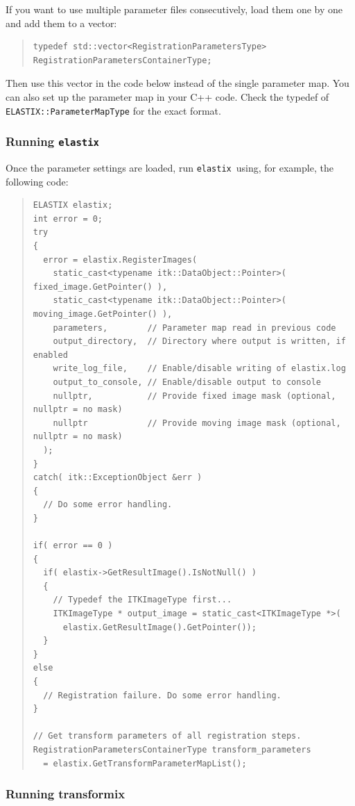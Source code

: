 \documentclass[]{report}
\newcommand{\elastix}{\texttt{elastix}}
\begin{document}
If you want to use multiple parameter files consecutively, load them
one by one and add them to a vector:
\begin{quote}
\begin{verbatim}
typedef std::vector<RegistrationParametersType> RegistrationParametersContainerType;
\end{verbatim}
\end{quote}
Then use this vector in the code below instead of the single
parameter map. You can also set up the parameter map in your C++
code. Check the typedef of \texttt{ELASTIX::ParameterMapType} for
the exact format.

\subsubsection{Running \elastix}

Once the parameter settings are loaded, run \elastix\ using, for
example, the following code:
\begin{quote}
\begin{verbatim}
ELASTIX elastix;
int error = 0;
try
{
  error = elastix.RegisterImages(
    static_cast<typename itk::DataObject::Pointer>( fixed_image.GetPointer() ),
    static_cast<typename itk::DataObject::Pointer>( moving_image.GetPointer() ),
    parameters,        // Parameter map read in previous code
    output_directory,  // Directory where output is written, if enabled
    write_log_file,    // Enable/disable writing of elastix.log
    output_to_console, // Enable/disable output to console
    nullptr,           // Provide fixed image mask (optional, nullptr = no mask)
    nullptr            // Provide moving image mask (optional, nullptr = no mask)
  );
}
catch( itk::ExceptionObject &err )
{
  // Do some error handling.
}

if( error == 0 )
{
  if( elastix->GetResultImage().IsNotNull() )
  {
    // Typedef the ITKImageType first...
    ITKImageType * output_image = static_cast<ITKImageType *>(
      elastix.GetResultImage().GetPointer());
  }
}
else
{
  // Registration failure. Do some error handling.
}

// Get transform parameters of all registration steps.
RegistrationParametersContainerType transform_parameters
  = elastix.GetTransformParameterMapList();
\end{verbatim}
\end{quote}

\subsubsection{Running transformix}
\end{document}
